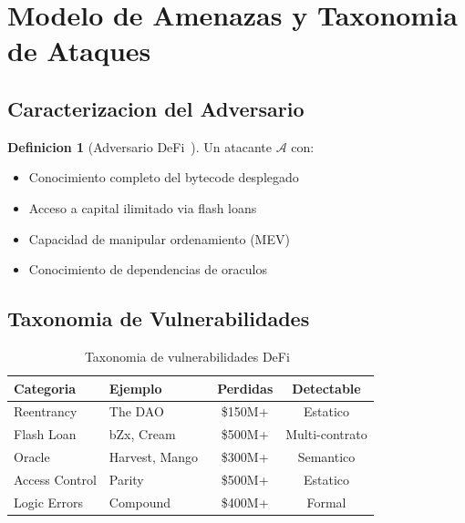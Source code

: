 \documentclass[11pt]{article}
\theoremstyle{definition}
\newtheorem{definicion}{Definicion}[section]
\theoremstyle{plain}
\theoremstyle{remark}
\begin{document}
\section{Modelo de Amenazas y Taxonomia de Ataques}
\label{sec:amenazas}

\subsection{Caracterizacion del Adversario}

\begin{definicion}[Adversario DeFi~\cite{zhou2023sok}]
Un atacante $\mathcal{A}$ con:
\begin{itemize}
    \item Conocimiento completo del bytecode desplegado
    \item Acceso a capital ilimitado via flash loans~\cite{qin2021attacking}
    \item Capacidad de manipular ordenamiento (MEV)~\cite{daian2020flash}
    \item Conocimiento de dependencias de oraculos~\cite{eskandari2021sok}
\end{itemize}
\end{definicion}

\subsection{Taxonomia de Vulnerabilidades}

\begin{table}[H]
\centering
\caption{Taxonomia de vulnerabilidades DeFi~\cite{zhou2023sok, chen2020survey}}
\label{tab:taxonomy}
\begin{tabular}{llcc}
\toprule
\textbf{Categoria} & \textbf{Ejemplo} & \textbf{Perdidas} & \textbf{Detectable} \\
\midrule
Reentrancy & The DAO~\cite{mehar2019understanding} & \$150M+ & Estatico \\
Flash Loan & bZx, Cream~\cite{qin2021attacking} & \$500M+ & Multi-contrato \\
Oracle & Harvest, Mango~\cite{eskandari2021sok} & \$300M+ & Semantico \\
Access Control & Parity~\cite{atzei2017survey} & \$500M+ & Estatico \\
Logic Errors & Compound~\cite{zhou2023sok} & \$400M+ & Formal \\
\bottomrule
\end{tabular}
\end{table}
\end{document}
